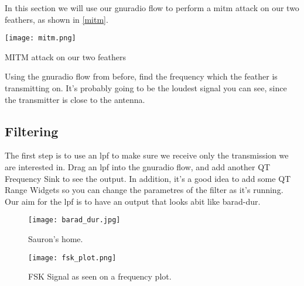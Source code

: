 In this section we will use our gnuradio flow to perform a \gls{mitm} attack on our two feathers, as shown in \cref{mitm}.

\centrefigurestart
\texttt{[image: mitm.png]}
\caption{MITM attack on our two feathers}
\label{mitm}
\centrefigureend

Using the gnuradio flow from before, find the frequency which the feather is transmitting on. It's probably going to be the loudest signal you can see, since the transmitter is close to the antenna. 

\subsection{Filtering}

The first step is to use an \gls{lpf} to make sure we receive only the transmission we are interested in. Drag an \gls{lpf} into the gnuradio flow, and add another QT Frequency Sink to see the output. In addition, it's a good idea to add some QT Range Widgets so you can change the parametres of the filter as it's running. Our aim for the \gls{lpf} is to have an output that looks abit like barad-dur.

\begin{figure}
    \centering
    \begin{minipage}{0.45\textwidth}
        \centering
        \texttt{[image: barad\_dur.jpg]} 
        \caption{Sauron's home.}
    \end{minipage}\hfill
    \begin{minipage}{0.45\textwidth}
        \centering
        \texttt{[image: fsk\_plot.png]}
        \caption{FSK Signal as seen on a frequency plot.}
    \end{minipage}
\end{figure}
